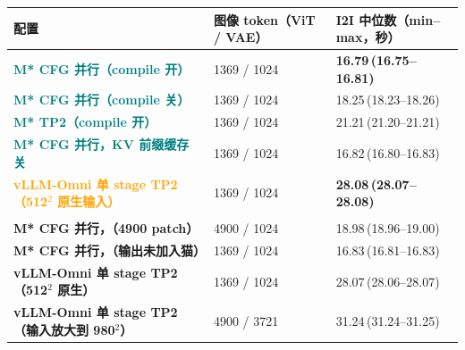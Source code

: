 \begin{tabularx}{\textwidth}{>{\bfseries}p{4.6cm} p{2.5cm} Y}
\toprule
{}
配置 & 图像 token（ViT / VAE） & I2I 中位数（min--max，秒） \\
\midrule
\textcolor{Teal}{M* CFG 并行（compile 开）} & 1369 / 1024 & \textbf{16.79\,\textcolor{Muted}{(16.75--16.81)}} \\
\textcolor{Teal}{M* CFG 并行（compile 关）} & 1369 / 1024 & 18.25\,\textcolor{Muted}{(18.23--18.26)} \\
\textcolor{Teal}{M* TP2（compile 开）} & 1369 / 1024 & 21.21\,\textcolor{Muted}{(21.20--21.21)} \\
\textcolor{Teal}{M* CFG 并行，KV 前缀缓存关} & 1369 / 1024 & 16.82\,\textcolor{Muted}{(16.80--16.83)} \\
\textcolor{Orange}{vLLM-Omni 单 stage TP2（512$^2$ 原生输入）} & 1369 / 1024 & \textbf{28.08\,\textcolor{Muted}{(28.07--28.08)}} \\
\midrule
{} \\
\textcolor{Muted}{M* CFG 并行，（4900 patch）} & 4900 / 1024 & 18.98\,\textcolor{Muted}{(18.96--19.00)} \\
\textcolor{Muted}{M* CFG 并行，（输出未加入猫）} & 1369 / 1024 & 16.83\,\textcolor{Muted}{(16.81--16.83)} \\
\textcolor{Muted}{vLLM-Omni 单 stage TP2（512$^2$ 原生）} & 1369 / 1024 & 28.07\,\textcolor{Muted}{(28.06--28.07)} \\
\textcolor{Muted}{vLLM-Omni 单 stage TP2（输入放大到 980$^2$）} & 4900 / 3721 & 31.24\,\textcolor{Muted}{(31.24--31.25)} \\
\bottomrule
\end{tabularx}
